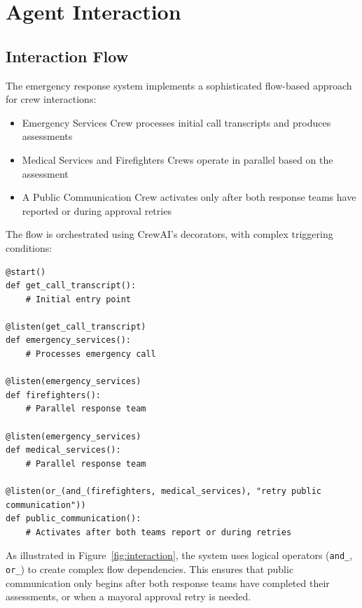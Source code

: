 \section{Agent Interaction}
\subsection{Interaction Flow}
The emergency response system implements a sophisticated flow-based approach for crew interactions:
\begin{itemize}
    \item Emergency Services Crew processes initial call transcripts and produces assessments
    \item Medical Services and Firefighters Crews operate in parallel based on the assessment
    \item A Public Communication Crew activates only after both response teams have reported or during approval retries
\end{itemize}

The flow is orchestrated using CrewAI's decorators, with complex triggering conditions:

\begin{lstlisting}[caption={Key Flow Control Points in Emergency Response}]
@start()
def get_call_transcript():
    # Initial entry point

@listen(get_call_transcript)
def emergency_services():
    # Processes emergency call

@listen(emergency_services)
def firefighters():
    # Parallel response team

@listen(emergency_services)
def medical_services():
    # Parallel response team

@listen(or_(and_(firefighters, medical_services), "retry public communication"))
def public_communication():
    # Activates after both teams report or during retries
\end{lstlisting}

As illustrated in Figure~\ref{fig:interaction}, the system uses logical operators (\texttt{and\_}, \texttt{or\_}) to create complex flow dependencies. This ensures that public communication only begins after both response teams have completed their assessments, or when a mayoral approval retry is needed.

